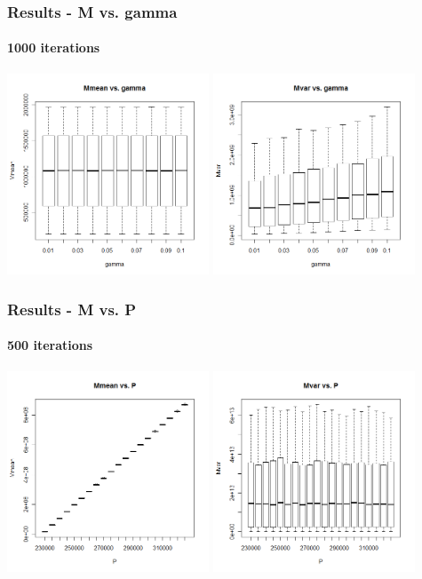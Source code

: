 \begin{frame}
    \frametitle{Results - M vs. gamma }
	\framesubtitle{1000 iterations}
\hspace*{-5mm}
\includegraphics[height=6cm]{boxplot1000_mmean_gamma}
\includegraphics[height=6cm]{boxplot1000_mvar_gamma}
\end{frame}





\begin{frame}
    \frametitle{Results - M vs. P }
	\framesubtitle{500 iterations}
\hspace*{-5mm}
\includegraphics[height=6cm]{boxplot500_mmean_P}
\includegraphics[height=6cm]{boxplot500_mvar_P}
\end{frame}


